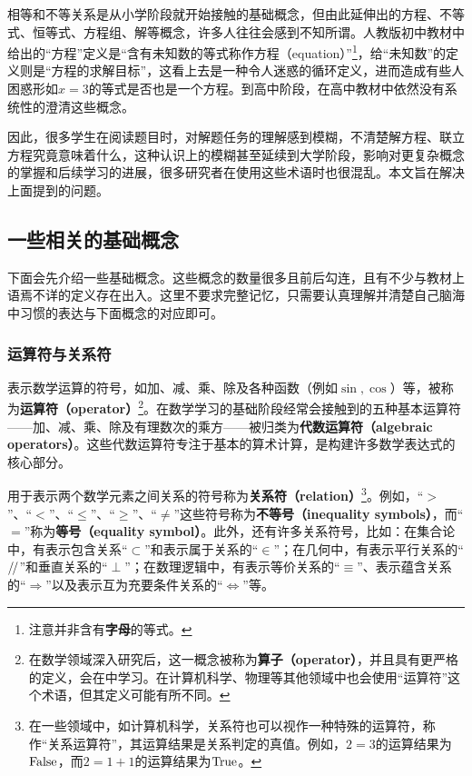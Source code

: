 
\begin{issues}
\issueDraft
\end{issues}


相等和不等关系是从小学阶段就开始接触的基础概念，但由此延伸出的方程、不等式、恒等式、方程组、解等概念，许多人往往会感到不知所谓。人教版初中教材中给出的“方程”定义是“含有未知数的等式称作方程（equation）”\footnote{注意并非含有\textbf{字母}的等式。}，给“未知数”的定义则是“方程的求解目标”，这看上去是一种令人迷惑的循环定义，进而造成有些人困惑形如$x=3$的等式是否也是一个方程。到高中阶段，在高中教材中依然没有系统性的澄清这些概念。

因此，很多学生在阅读题目时，对解题任务的理解感到模糊，不清楚解方程、联立方程究竟意味着什么，这种认识上的模糊甚至延续到大学阶段，影响对更复杂概念的掌握和后续学习的进展，很多研究者在使用这些术语时也很混乱。本文旨在解决上面提到的问题。

\subsection{一些相关的基础概念}

下面会先介绍一些基础概念。这些概念的数量很多且前后勾连，且有不少与教材上语焉不详的定义存在出入。这里不要求完整记忆，只需要认真理解并清楚自己脑海中习惯的表达与下面概念的对应即可。

\subsubsection{运算符与关系符}

表示数学运算的符号，如加、减、乘、除及各种函数（例如$\sin,\cos$）等，被称为\textbf{运算符（operator）}\footnote{在数学领域深入研究后，这一概念被称为\textbf{算子（operator）}，并且具有更严格的定义，会在中学习。在计算机科学、物理等其他领域中也会使用“运算符”这个术语，但其定义可能有所不同。}。在数学学习的基础阶段经常会接触到的五种基本运算符——加、减、乘、除及有理数次的乘方——被归类为\textbf{代数运算符（algebraic operators）}。这些代数运算符专注于基本的算术计算，是构建许多数学表达式的核心部分。

用于表示两个数学元素之间关系的符号称为\textbf{关系符（relation）}\footnote{在一些领域中，如计算机科学，关系符也可以视作一种特殊的运算符，称作“关系运算符”，其运算结果是关系判定的真值。例如，$2=3$的运算结果为$\rm False$，而$2=1+1$的运算结果为$\rm True$。}。例如，“$>$”、“$<$”、“$\leq$”、“$\geq$”、“$\neq$”这些符号称为\textbf{不等号（inequality symbols）}，而“$=$”称为\textbf{等号（equality symbol）}。此外，还有许多关系符号，比如：在集合论中，有表示包含关系“$\subset$”和表示属于关系的“$\in$”；在几何中，有表示平行关系的“$\mathrel{/\mskip-2.5mu/}$”和垂直关系的“$\perp$”；在数理逻辑中，有表示等价关系的“$\equiv$”、表示蕴含关系的“$\Rightarrow$”以及表示互为充要条件关系的“$\iff$”等。

